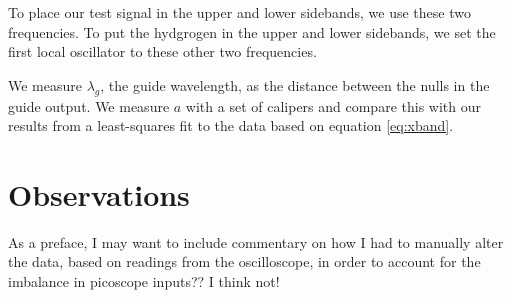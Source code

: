 \documentclass[12pt]{article}
\begin{document}
To place our test signal in the upper and lower sidebands, we use these two frequencies. To put the hydgrogen in the upper and lower sidebands, we set the first local oscillator to these other two frequencies.

We measure $\lambda_g$, the guide wavelength, as the distance between the nulls in the guide output. We measure $a$ with a set of calipers and compare this with our results from a least-squares fit to the data based on equation \ref{eq:xband}.

\section{Observations}

As a preface, I may want to include commentary on how I had to manually alter the data, based on readings from the oscilloscope, in order to account for the imbalance in picoscope inputs?? I think not!





\end{document}
